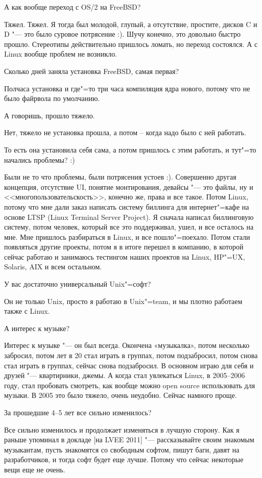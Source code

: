 \documentclass[10pt, a5paper]{article}
\begin{document}
\q А как вообще переход с OS/2 на FreeBSD?

\a Тяжел. Тяжел. Я тогда был молодой, глупый, а отсутствие, простите, дисков C и D "--- это было суровое потрясение :). Шучу конечно, это довольно быстро прошло. Стереотипы действительно пришлось ломать, но переход состоялся. А с Linux вообще проблем не возникло.

\q Сколько дней заняла установка FreeBSD, самая первая?

\a Полчаса установка и где"=то три часа компиляция ядра нового, потому что не было файрвола по умолчанию. 

\q А говоришь, прошло тяжело.

\a Нет, тяжело не установка прошла, а потом – когда надо было с ней работать.

\q То есть она установила себя сама, а потом пришлось с этим работать, и тут"=то начались проблемы? :)

\a Были не то что проблемы, были потрясения устоев :). Совершенно другая концепция, отсутствие UI, понятие монтирования, девайсы "--- это файлы, ну и <<многопользовательскость>>, конечно же, права и все такое.  Потом Linux, потому что мне дали заказ написать систему биллинга для интернет"=кафе на основе LTSP (Linux Terminal Server Project). Я сначала написал биллинговую систему, потом человек, который все это поддерживал, ушел, и все осталось на мне. Мне пришлось разбираться в Linux, и все пошло"=поехало. Потом стали появляться другие проекты, потом я в итоге перешел в компанию, в которой сейчас работаю и занимаюсь тестингом наших проектов на Linux, HP"=UX, Solaris, AIX и всем остальном.

\q У вас достаточно универсальный Unix"=софт?

\a Он не только Unix, просто я работаю в Unix"=team, и мы плотно работаем также с Linux.

\q А интерес к музыке?

\a Интерес к музыке "--- он был всегда. Окончена «музыкалка», потом несколько забросил, потом лет в 20 стал играть в группах, потом подзабросил, потом снова стал играть в группах, сейчас снова подзабросил. В основном играю для себя и друзей "--- квартирники, джемы. А когда стал увлекаться Linux, в 2005--2006 году, стал пробовать смотреть, как вообще можно open source использовать для музыки. В 2005 это было тяжело, очень неудобно. Сейчас намного проще. 

\q За прошедшие 4--5 лет все сильно изменилось?

\a Все сильно изменилось и продолжает изменяться в лучшую сторону. Как я раньше упоминал в докладе [на LVEE 2011] "--- рассказывайте своим знакомым музыкантам, пусть знакомятся со свободным софтом, пишут баги, давят на разработчиков, и тогда софт будет еще лучше. Потому что сейчас некоторые вещи еще не очень.
\end{document}
